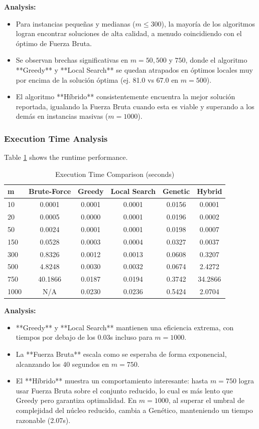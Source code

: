 \textbf{Analysis:}
\begin{itemize}
    \item Para instancias pequeñas y medianas ($m \le 300$), la mayoría de los algoritmos logran encontrar soluciones de alta calidad, a menudo coincidiendo con el óptimo de Fuerza Bruta.
    \item Se observan brechas significativas en $m=50, 500$ y $750$, donde el algoritmo **Greedy** y **Local Search** se quedan atrapados en óptimos locales muy por encima de la solución óptima (ej. 81.0 vs 67.0 en $m=500$).
    \item El algoritmo **Híbrido** consistentemente encuentra la mejor solución reportada, igualando la Fuerza Bruta cuando esta es viable y superando a los demás en instancias masivas ($m=1000$).
\end{itemize}

\subsubsection{Execution Time Analysis}

Table \ref{tab:time-comparison} shows the runtime performance.

\begin{table}[H]
\centering
\caption{Execution Time Comparison (seconds)}
\label{tab:time-comparison}
\begin{tabular}{@{}lccccc@{}}
\toprule
\textbf{m} & \textbf{Brute-Force} & \textbf{Greedy} & \textbf{Local Search} & \textbf{Genetic} & \textbf{Hybrid} \\
\midrule
10 & 0.0001 & 0.0001 & 0.0001 & 0.0156 & 0.0001 \\
20 & 0.0005 & 0.0000 & 0.0001 & 0.0196 & 0.0002 \\
50 & 0.0024 & 0.0001 & 0.0001 & 0.0198 & 0.0007 \\
150 & 0.0528 & 0.0003 & 0.0004 & 0.0327 & 0.0037 \\
300 & 0.8326 & 0.0012 & 0.0013 & 0.0608 & 0.3207 \\
500 & 4.8248 & 0.0030 & 0.0032 & 0.0674 & 2.4272 \\
750 & 40.1866 & 0.0187 & 0.0194 & 0.3742 & 34.2866 \\
1000 & N/A & 0.0230 & 0.0236 & 0.5424 & 2.0704 \\
\bottomrule
\end{tabular}
\end{table}

\textbf{Analysis:}
\begin{itemize}
    \item **Greedy** y **Local Search** mantienen una eficiencia extrema, con tiempos por debajo de los 0.03s incluso para $m=1000$.
    \item La **Fuerza Bruta** escala como se esperaba de forma exponencial, alcanzando los 40 segundos en $m=750$.
    \item El **Híbrido** muestra un comportamiento interesante: hasta $m=750$ logra usar Fuerza Bruta sobre el conjunto reducido, lo cual es más lento que Greedy pero garantiza optimalidad. En $m=1000$, al superar el umbral de complejidad del núcleo reducido, cambia a Genético, manteniendo un tiempo razonable (2.07s).
\end{itemize}


